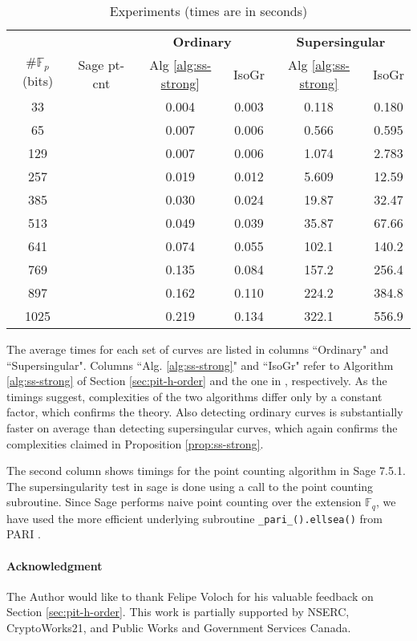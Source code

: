 \documentclass[12pt]{article}
\theoremstyle{plain}
\theoremstyle{definition}
\def\F{\ensuremath{\mathbb{F}}}
\begin{document}
\begin{table}
	\centering
	\small
	\begin{tabular}{cccccc}
		& & \multicolumn{2}{c}{\bfseries Ordinary} & \multicolumn{2}{c}{\bfseries Supersingular} \\
		\cmidrule[0.7pt](r){3-4} \cmidrule[0.7pt](l){5-6} 
		$\#\F_p$ (bits) & Sage pt-cnt & Alg \ref{alg:ss-strong} & IsoGr & Alg 
		\ref{alg:ss-strong} & IsoGr \\
		\midrule[0.7pt]
		33 &  & 0.004 & 0.003 & 0.118 & 0.180 \\
		65 &  &  0.007 & 0.006 & 0.566 & 0.595 \\
		129 &  &  0.007 & 0.006 & 1.074 & 2.783 \\
		257 &  &  0.019 & 0.012 & 5.609 & 12.59 \\
		385 &  &  0.030 & 0.024 & 19.87 & 32.47 \\
		513 &  &  0.049 & 0.039 & 35.87 & 67.66 \\
		641 &  &  0.074 & 0.055 & 102.1 & 140.2 \\
		769 &  &  0.135 & 0.084 & 157.2 & 256.4 \\
		897 &  &  0.162 & 0.110 & 224.2 & 384.8 \\
		1025 &  &  0.219 & 0.134 & 322.1 & 556.9 \\		
		\midrule[0.7pt]
	\end{tabular}
	\caption{Experiments (times are in seconds)}
	\label{table:exper}
\end{table}

The average times for each set of curves are listed in columns ``Ordinary" and ``Supersingular". 
Columns ``Alg. \ref{alg:ss-strong}" and ``IsoGr" refer to Algorithm \ref{alg:ss-strong} of Section 
\ref{sec:pit-h-order} and the one in \cite{sutherland2012}, respectively. As the timings suggest, 
complexities of the two algorithms differ only by a constant factor, which confirms the theory. 
Also detecting ordinary curves is substantially faster on average than detecting supersingular 
curves, which again confirms the complexities claimed in Proposition \ref{prop:ss-strong}. 

The second column shows timings for the point counting algorithm in Sage 7.5.1. The 
supersingularity test in sage is done using a call to the point counting subroutine. Since Sage 
performs naive point counting over the extension $\F_q$, we have used the more efficient underlying 
subroutine \verb|_pari_().ellsea()| from PARI \cite{Pari}. 

\paragraph{Acknowledgment}
The Author would like to thank Felipe Voloch for his valuable feedback on Section 
\ref{sec:pit-h-order}. This work is partially supported by NSERC, CryptoWorks21, and Public Works 
and Government Services Canada.






\end{document}
